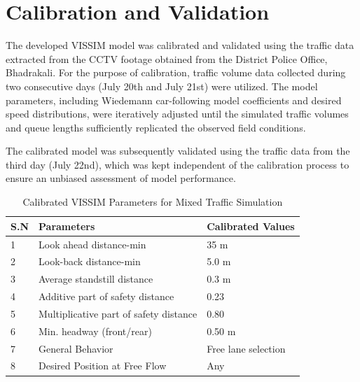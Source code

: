 \section{Calibration and Validation}
The developed VISSIM model was calibrated and validated using the traffic data extracted from the CCTV footage 
obtained from the District Police Office, Bhadrakali. For the purpose of calibration, traffic volume data collected 
during two consecutive days (July 20th and July 21st) were utilized. The model parameters, including Wiedemann 
car-following model coefficients and desired speed distributions, were iteratively adjusted until the simulated traffic 
volumes and queue lengths sufficiently replicated the observed field conditions. 

The calibrated model was subsequently validated using the traffic data from the third day (July 22nd), which was kept 
independent of the calibration process to ensure an unbiased assessment of model performance.  


\begin{table}[h]
    \centering
    \caption{Calibrated VISSIM Parameters for Mixed Traffic Simulation}
\begin{tabular}{|l|l|l|}
    \hline
    \textbf{S.N} & \textbf{Parameters} & \textbf{Calibrated Values} \\
    \hline
    1 &	Look ahead distance-min &	35 m \\
    \hline
    2 &	Look-back distance-min	& 5.0 m \\
    \hline
    3 &	Average standstill distance	& 0.3 m \\
    \hline
    4 &	Additive part of safety distance	& 0.23 \\
    \hline
    5 &	Multiplicative part of safety distance	& 0.80 \\
    \hline
    6 &	Min. headway (front/rear)	& 0.50 m \\
    \hline
    7 &	General Behavior	& Free lane selection \\
    \hline
    8 &	Desired Position at Free Flow &	Any \\
    \hline

    
\end{tabular}
\end{table}


